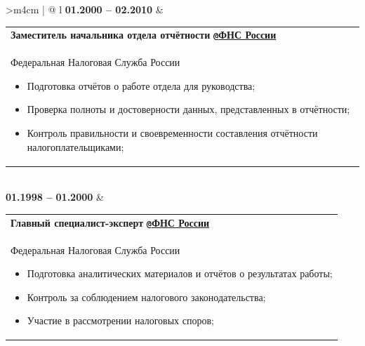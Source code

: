\documentclass{anisyan-resume}
\begin{document}
\begin{tabularx}{\textwidth}{>{\quad}m{4cm} | @{\timelinebullet} l}
		\normalsize\textbf{01.2000 -- 02.2010}
		&
		\renewcommand\arraystretch{1}
		\begin{tabular}[t]{ p{15cm} }
		\large{\textbf{Заместитель начальника отдела отчётности}} \texttt{\textbf{@}}\href{https://www.nalog.gov.ru}{\textbf{ФНС России}}\\
		\normalsize{Федеральная Налоговая Служба России}
		\renewcommand\labelitemi{{\boldmath$\cdot$}}
		\begin{itemize}[noitemsep, topsep=5pt, parsep=0pt, partopsep=0pt]
			\item {\small Подготовка отчётов о работе отдела для руководства;}
			\item {\small Проверка полноты и достоверности данных, представленных в отчётности;}
			\item {\small Контроль правильности и своевременности составления отчётности налогоплательщиками;}
		\end{itemize}
		\end{tabular} \\

		\normalsize\textbf{01.1998 -- 01.2000}
		&
		\renewcommand\arraystretch{1}
		\begin{tabular}[t]{ p{15cm} }
		\large{\textbf{Главный специалист-эксперт}} \texttt{\textbf{@}}\href{https://www.nalog.gov.ru}{\textbf{ФНС России}}\\
		\normalsize{Федеральная Налоговая Служба России}
		\renewcommand\labelitemi{{\boldmath$\cdot$}}
		\begin{itemize}[noitemsep, topsep=5pt, parsep=0pt, partopsep=0pt]
			\item {\small Подготовка аналитических материалов и отчётов о результатах работы;}
			\item {\small Контроль за соблюдением налогового законодательства;}
			\item {\small Участие в рассмотрении налоговых споров;}
		\end{itemize}
		\end{tabular} \\


\end{tabularx}
\end{document}
